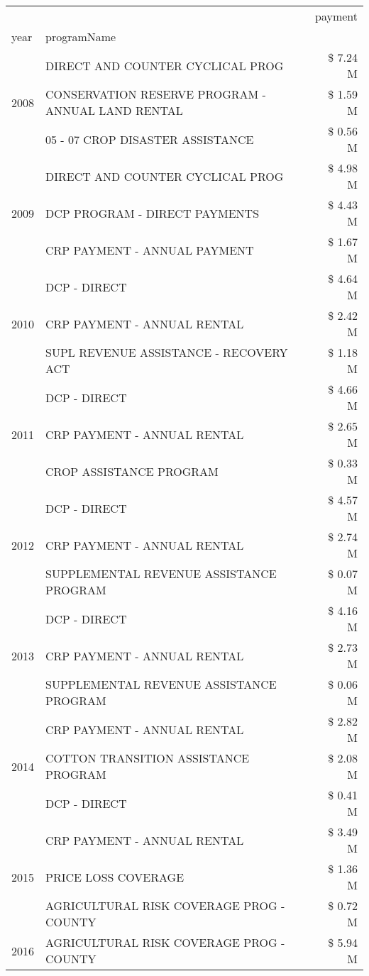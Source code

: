 \begin{tabular}{llr}
\toprule
 &  & payment \\
year & programName &  \\
\midrule
\multirow[t]{3}{*}{2008} & DIRECT AND COUNTER CYCLICAL PROG & \$ 7.24 M \\
 & CONSERVATION RESERVE PROGRAM - ANNUAL LAND RENTAL & \$ 1.59 M \\
 & 05 - 07 CROP DISASTER ASSISTANCE & \$ 0.56 M \\
\cline{1-3}
\multirow[t]{3}{*}{2009} & DIRECT AND COUNTER CYCLICAL PROG & \$ 4.98 M \\
 & DCP PROGRAM - DIRECT PAYMENTS & \$ 4.43 M \\
 & CRP PAYMENT - ANNUAL PAYMENT & \$ 1.67 M \\
\cline{1-3}
\multirow[t]{3}{*}{2010} & DCP - DIRECT & \$ 4.64 M \\
 & CRP PAYMENT - ANNUAL RENTAL & \$ 2.42 M \\
 & SUPL REVENUE ASSISTANCE - RECOVERY ACT & \$ 1.18 M \\
\cline{1-3}
\multirow[t]{3}{*}{2011} & DCP - DIRECT & \$ 4.66 M \\
 & CRP PAYMENT - ANNUAL RENTAL & \$ 2.65 M \\
 & CROP ASSISTANCE PROGRAM & \$ 0.33 M \\
\cline{1-3}
\multirow[t]{3}{*}{2012} & DCP - DIRECT & \$ 4.57 M \\
 & CRP PAYMENT - ANNUAL RENTAL & \$ 2.74 M \\
 & SUPPLEMENTAL REVENUE ASSISTANCE PROGRAM & \$ 0.07 M \\
\cline{1-3}
\multirow[t]{3}{*}{2013} & DCP - DIRECT & \$ 4.16 M \\
 & CRP PAYMENT - ANNUAL RENTAL & \$ 2.73 M \\
 & SUPPLEMENTAL REVENUE ASSISTANCE PROGRAM & \$ 0.06 M \\
\cline{1-3}
\multirow[t]{3}{*}{2014} & CRP PAYMENT - ANNUAL RENTAL & \$ 2.82 M \\
 & COTTON TRANSITION ASSISTANCE PROGRAM & \$ 2.08 M \\
 & DCP - DIRECT & \$ 0.41 M \\
\cline{1-3}
\multirow[t]{3}{*}{2015} & CRP PAYMENT - ANNUAL RENTAL & \$ 3.49 M \\
 & PRICE LOSS COVERAGE & \$ 1.36 M \\
 & AGRICULTURAL RISK COVERAGE PROG - COUNTY & \$ 0.72 M \\
\cline{1-3}
\multirow[t]{3}{*}{2016} & AGRICULTURAL RISK COVERAGE PROG - COUNTY & \$ 5.94 M \\

\end{tabular}
